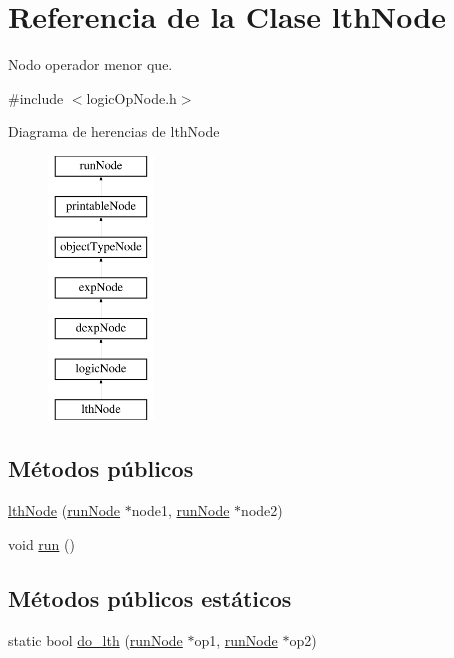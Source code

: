 \hypertarget{classlthNode}{\section{Referencia de la Clase lth\-Node}
\label{classlthNode}
}


Nodo operador menor que.  




{\ttfamily \#include $<$logic\-Op\-Node.\-h$>$}

Diagrama de herencias de lth\-Node\begin{figure}[H]
\begin{center}
\leavevmode
\includegraphics[height=7.000000cm]{classlthNode}
\end{center}
\end{figure}
\subsection*{Métodos públicos}
\begin{DoxyCompactItemize}
\item 
\hyperlink{classlthNode_a467b1d41091b8de7a491b8176fc9cea3}{lth\-Node} (\hyperlink{classrunNode}{run\-Node} $\ast$node1, \hyperlink{classrunNode}{run\-Node} $\ast$node2)
\item 
void \hyperlink{classlthNode_af7b0f02382415e845606e0c6e5795726}{run} ()
\end{DoxyCompactItemize}
\subsection*{Métodos públicos estáticos}
\begin{DoxyCompactItemize}
\item 
static bool \hyperlink{classlthNode_aa7374e4f580eba442d8347f1c836e1dc}{do\-\_\-lth} (\hyperlink{classrunNode}{run\-Node} $\ast$op1, \hyperlink{classrunNode}{run\-Node} $\ast$op2)
\end{DoxyCompactItemize}
